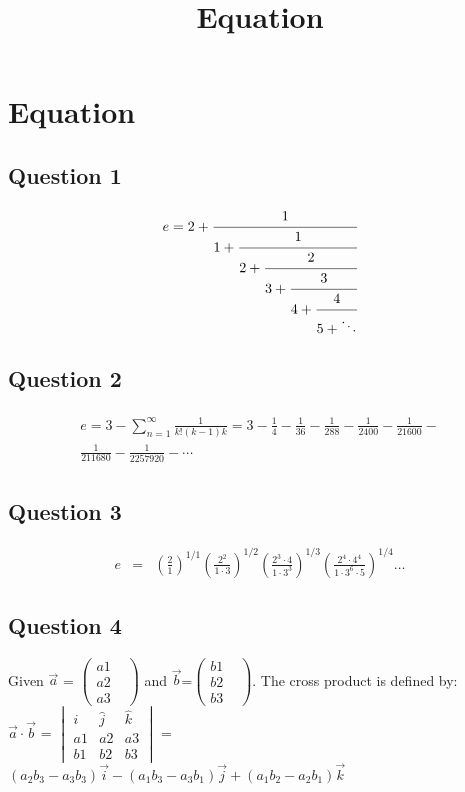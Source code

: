 \documentclass[a4paper,12pt]{report}
\begin{document}
\title{Equation}
\maketitle
\chapter{Equation}
    \section{Question 1}
    \begin{equation*}
         e = 2+\cfrac{1}{1+\cfrac{1}{2+\cfrac{2}{3+\cfrac{3}{4+\cfrac{4}{5+\ddots}}}}}
    \end{equation*}

    \section{Question 2}
    \begin{eqnarray}
    \begin{split}
          e = 3-\sum_{n = 1}^{\infty}   \frac{1}{k!(k-1)k} = 3-\frac{1}{4}-\frac{1}{36}-\frac{1}{288}-\frac{1}{2400}-\frac{1}{21600}-\\\frac{1}{211680}-\frac{1}{2257920}- \cdots
    \end{split}
    \end{eqnarray}

    \section{Question 3}
    \begin{eqnarray}
        e&=&\left(\frac{2}{1}\right)^{1/1}\left(\frac{2^2}{1\cdot3}\right)^{1/2}\left(\frac{2^3\cdot4}{1\cdot3^3}\right)^{1/3}\left(\frac{2^4\cdot4^4}{1\cdot3^6\cdot5}\right)^{1/4}\dots
    \end{eqnarray}

    \section{Question 4}
    
    Given $ \vec{a}$ = $\begin{pmatrix}
        a1 & \\
        a2 & \\
        a3 &
    \end{pmatrix} $ and $\vec{b}$=$\begin{pmatrix}
        b1 & \\
        b2 & \\
        b3 &
    \end{pmatrix}$. The cross product is defined by:\\
$\vec{a} \cdot \vec{b}$ = $\begin{vmatrix}
        \hat i & \hat j & \hat k \\
        a1     & a2     & a3     \\
        b1     & b2     & b3
    \end{vmatrix}$ = $(a_2b_3-a_3b_3)\vec{i}-(a_1b_3-a_3b_1)\vec{j}+(a_1b_2-a_2b_1)\vec{k}$
\end{document}
